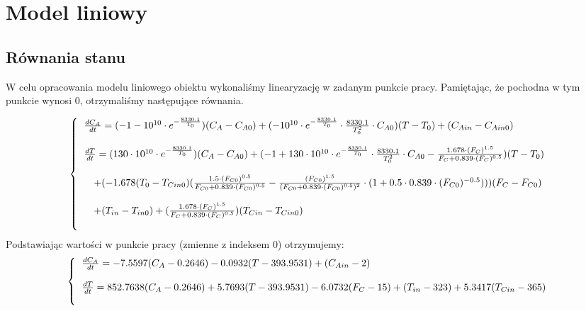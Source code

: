 \chapter{Model liniowy}
\section{Równania stanu}
W celu opracowania modelu liniowego obiektu wykonaliśmy linearyzację w zadanym punkcie pracy. Pamiętając, że pochodna w tym punkcie wynosi 0, otrzymaliśmy następujące równania.

\begin{equation}
\left\{
\begin{tabular}{l}
$\frac{dC_A}{dt} = (-1-10^{10}\cdot e^{-\frac{8330.1}{T_0}})(C_A-C_{A0})+(-10^{10}\cdot e^{-\frac{8330.1}{T_0}}\cdot \frac{8330.1}{T_0^2}\cdot C_{A0})(T-T_0)+(C_{Ain}-C_{Ain0})$\\\\
$\frac{dT}{dt} = (130\cdot 10^{10}\cdot e^{-\frac{8330.1}{T_0}})(C_A-C_{A0}) + (-1+130\cdot 10^{10}\cdot e^{-\frac{8330.1}{T_0}}\cdot \frac{8330.1}{T_0^2}\cdot C_{A0}-\frac{1.678\cdot (F_C)^{1.5}}{F_C+0.839\cdot (F_C)^{0.5}})(T-T_0)$\\\\
$\quad + (-1.678(T_0-T_{Cin0})(\frac{1.5\cdot (F_{C0})^{0.5}}{F_{C0}+0.839\cdot (F_{C0})^{0.5}}-\frac{ (F_{C0})^{1.5}}{(F_{C0}+0.839\cdot (F_{C0})^{0.5})^2}\cdot (1+0.5\cdot 0.839 \cdot (F_{C0})^{-0.5})))(F_C-F_{C0})$\\\\
$\quad + (T_{in} - T_{in0}) + (\frac{1.678\cdot (F_C)^{1.5}}{F_C+0.839\cdot (F_C)^{0.5}})(T_{Cin} - T_{Cin0})$\\\\
\end{tabular}
\right.
\end{equation}
Podstawiając wartości w punkcie pracy (zmienne z indeksem 0) otrzymujemy:
\begin{equation}
\left\{
\begin{tabular}{l}
$\frac{dC_A}{dt} = -7.5597(C_A-0.2646)-0.0932(T-393.9531)+(C_{Ain}-2)$\\\\
$\frac{dT}{dt} = 852.7638(C_A-0.2646) + 5.7693(T-393.9531) -6.0732(F_C-15) + (T_{in} - 323) + 5.3417(T_{Cin} - 365)$\\\\
\end{tabular}
\right.
\end{equation}

